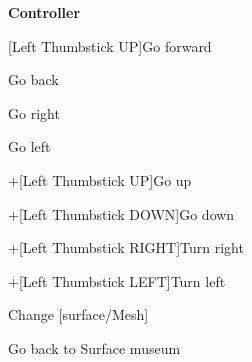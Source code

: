 \documentclass[12pt,dvipdfmx]{article}
\begin{document}
\begin{center}

{\bf \LARGE Controller}

\end{center}

{\Large
[Left Thumbstick UP]\quad Go forward \par 
[Left Thumbstick DOWN]\quad Go back \par 
[Left Thumbstick RIGHT]\quad Go right \par 
[Left Thumbstick LEFT]\quad Go left \par 
[Left Hand Trigger]+[Left Thumbstick UP]\quad Go up \par 
[Left Hand Trigger]+[Left Thumbstick DOWN]\quad Go down \par 
[Left Hand Trigger]+[Left Thumbstick RIGHT]\quad Turn right \par 
[Left Hand Trigger]+[Left Thumbstick LEFT]\quad Turn left \par 
\bigskip
[B] \quad Change [surface/Mesh]\par
\bigskip\par
[Left Start]\quad Go back to Surface museum

}
\end{document}
